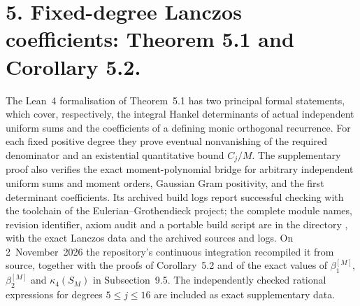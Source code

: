 \documentclass[11pt,a4paper]{article}
\newcommand{\R}{https://github.com/ralfanop/Certifications_Eulerian_polar-curve_computations}
\newcommand{\dir}[1]{\href{\R/tree/main/#1}{\texttt{\detokenize{#1}}}}
\begin{document}
\section*{5. Fixed-degree Lanczos coefficients: Theorem 5.1 and Corollary 5.2.}
The Lean~4 formalisation of Theorem~5.1 has two principal formal statements, which cover, respectively, the integral Hankel determinants of actual independent uniform sums and the coefficients of a defining monic orthogonal recurrence. For each fixed positive degree they prove eventual nonvanishing of the required denominator and an existential quantitative bound $C_j/M$. The supplementary proof also verifies the exact moment-polynomial bridge for arbitrary independent uniform sums and moment orders, Gaussian Gram positivity, and the first determinant coefficients. Its archived build logs report successful checking with the toolchain of the Eulerian--Grothendieck project; the complete module names, revision identifier, axiom audit and a portable build script are in the directory \dir{lean/FixedDegreeLanczos}, with the exact Lanczos data and the archived sources and logs. On 2~November~2026 the repository's continuous integration recompiled it from source, together with the proofs of Corollary~5.2 and of the exact values of $\beta_1^{[M]}$, $\beta_2^{[M]}$ and $\kappa_4(S_M)$ in Subsection~9.5. The independently checked rational expressions for degrees $5\leq j\leq16$ are included as exact supplementary data.
\end{document}
